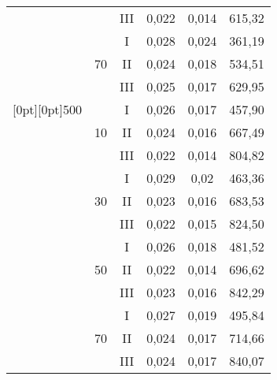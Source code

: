\begin{table*}
\begin{center}
\begin{tabular}{|c|c|c|c|c|c|}
&&III& 0{,}022 & 0{,}014 & 615{,}32 \\
\cline{2-6}
& &I& 0{,}028 & 0{,}024 & 361{,}19 \\
&70&II& 0{,}024 & 0{,}018 & 534{,}51 \\
&&III& 0{,}025 & 0{,}017 & 629{,}95 \\
\hline
\multicolumn{1}{|c|}{\raisebox{-60pt}[0pt][0pt]{500}} &&I& 0{,}026 & 0{,}017 & 457{,}90 \\
&10&II& 0{,}024 & 0{,}016 & 667{,}49 \\
&&III& 0{,}022 & 0{,}014 & 804{,}82 \\
\cline{2-6}
& &I& 0{,}029 & 0{,}02 & 463{,}36 \\
&30&II& 0{,}023 & 0{,}016 & 683{,}53 \\
&&III& 0{,}022 & 0{,}015 & 824{,}50 \\
\cline{2-6}
&&I& 0{,}026 & 0{,}018 & 481{,}52 \\
&50&II& 0{,}022 & 0{,}014 & 696{,}62 \\
&&III& 0{,}023 & 0{,}016 & 842{,}29 \\
\cline{2-6}
& &I& 0{,}027 & 0{,}019 & 495{,}84 \\
&70&II& 0{,}024 & 0{,}017 & 714{,}66 \\
&&III& 0{,}024 & 0{,}017 & 840{,}07 \\
\hline
\end{tabular}
\end{center}
\vspace*{-6pt}
\end{table*}

